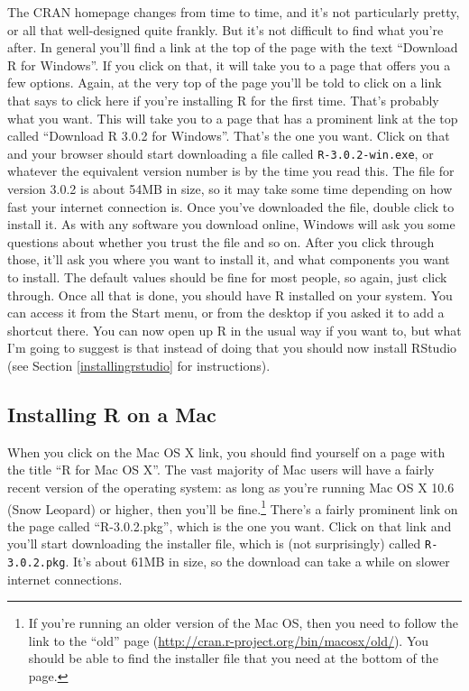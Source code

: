 \documentclass[
]{book}
\begin{document}
The CRAN homepage changes from time to time, and it's not particularly pretty, or all that well-designed quite frankly. But it's not difficult to find what you're after. In general you'll find a link at the top of the page with the text ``Download R for Windows''. If you click on that, it will take you to a page that offers you a few options. Again, at the very top of the page you'll be told to click on a link that says to click here if you're installing R for the first time. That's probably what you want. This will take you to a page that has a prominent link at the top called ``Download R 3.0.2 for Windows''. That's the one you want. Click on that and your browser should start downloading a file called \texttt{R-3.0.2-win.exe}, or whatever the equivalent version number is by the time you read this. The file for version 3.0.2 is about 54MB in size, so it may take some time depending on how fast your internet connection is. Once you've downloaded the file, double click to install it. As with any software you download online, Windows will ask you some questions about whether you trust the file and so on. After you click through those, it'll ask you where you want to install it, and what components you want to install. The default values should be fine for most people, so again, just click through. Once all that is done, you should have R installed on your system. You can access it from the Start menu, or from the desktop if you asked it to add a shortcut there. You can now open up R in the usual way if you want to, but what I'm going to suggest is that instead of doing that you should now install RStudio (see Section \ref{installingrstudio} for instructions).

\hypertarget{installing-r-on-a-mac}{%
\subsection{Installing R on a Mac}\label{installing-r-on-a-mac}}

When you click on the Mac OS X link, you should find yourself on a page with the title ``R for Mac OS X''. The vast majority of Mac users will have a fairly recent version of the operating system: as long as you're running Mac OS X 10.6 (Snow Leopard) or higher, then you'll be fine.\footnote{If you're running an older version of the Mac OS, then you need to follow the link to the ``old'' page (\url{http://cran.r-project.org/bin/macosx/old/}). You should be able to find the installer file that you need at the bottom of the page.} There's a fairly prominent link on the page called ``R-3.0.2.pkg'', which is the one you want. Click on that link and you'll start downloading the installer file, which is (not surprisingly) called \texttt{R-3.0.2.pkg}. It's about 61MB in size, so the download can take a while on slower internet connections.
\end{document}
